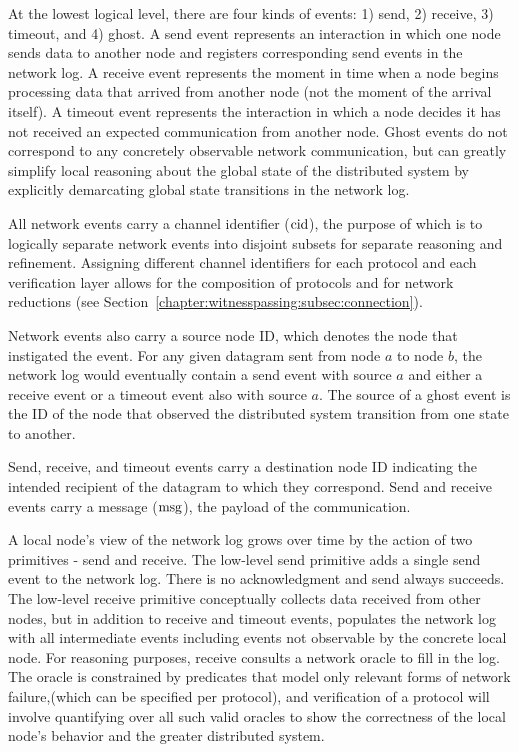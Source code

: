 At the lowest logical level, there are four kinds of events: 1) send, 2) receive,
3) timeout, and 4) ghost. A send event represents an interaction in which one
node sends data to another node and registers corresponding send events in the
network log. A receive event represents the moment in time when a node begins
processing data that arrived from another node (not the moment of the arrival
itself). A timeout event represents the interaction in which a node decides it
has not received an expected communication from another node. Ghost events do
not correspond to any concretely observable network communication, but can
greatly simplify local reasoning about the global state of the distributed
system by explicitly demarcating global state transitions in the network log.

All network events carry a channel identifier ($\mathrm{cid}$), the purpose of which is
to logically separate network events into disjoint subsets for separate
reasoning and refinement. Assigning different channel identifiers for each
protocol and each verification layer allows for the composition of protocols and
for network reductions (see Section~\ref{chapter:witnesspassing:subsec:connection}).

Network events also carry a source node ID, which denotes the node that
instigated the event. For any given datagram sent from node $a$ to node $b$, the
network log would eventually contain a send event with source $a$ and either a
receive event or a timeout event also with source $a$. The source of a ghost
event is the ID of the node that observed the distributed system transition from
one state to another.  Send, receive, and timeout events carry a
destination node ID indicating the intended recipient of the datagram to which
they correspond. Send and receive events carry a message ($\mathrm{msg}$), the payload
of the communication.

A local node's view of the network log grows over time by the action of two
primitives - send and receive. The low-level send primitive adds a single send
event to the network log. There is no acknowledgment and send always succeeds.
The low-level receive primitive conceptually collects data received from other
nodes, but in addition to receive and timeout events, populates the network log
with all intermediate events including events not observable by the
concrete local node. For reasoning purposes, receive consults a network oracle
to fill in the log. The oracle is constrained by predicates that model only
relevant forms of network failure,(which can be specified per protocol), and
verification of a protocol will involve quantifying over all such valid oracles
to show the correctness of the local node's behavior and the greater distributed
system.


